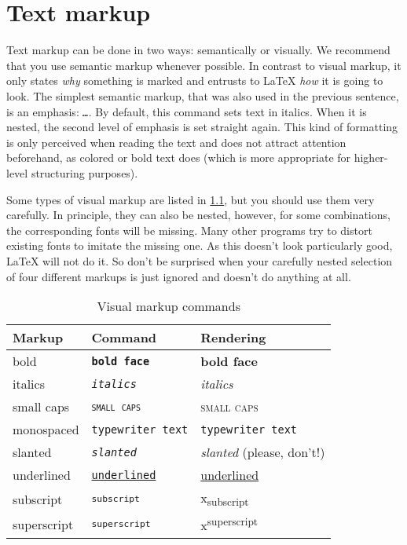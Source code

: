 \chapter{Text markup}

Text markup can be done in two ways: semantically or visually.
We recommend that you use semantic markup whenever possible.
In contrast to visual markup, it only states \emph{why} something is marked and entrusts to \LaTeX{} \emph{how} it is going to look.
The simplest semantic markup, that was also used in the previous sentence, is an emphasis: \texttt{\emph{…}}.
By default, this command sets text in italics.
When it is nested, the second level of emphasis is set straight again.
This kind of formatting is only perceived when reading the text and does not attract attention beforehand, as colored or bold text does (which is more appropriate for higher-level structuring purposes).

Some types of visual markup are listed in \cref{tbl:visual-markup}, but you should use them very carefully.
In principle, they can also be nested, however, for some combinations, the corresponding fonts will be missing.
Many other programs try to distort existing fonts to imitate the missing one.
As this doesn’t look particularly good, \LaTeX{} will not do it.
So don’t be surprised when your carefully nested selection of four different markups is just ignored and doesn’t do anything at all.

\begin{table}[H]
	\center
	\begin{tabular}{lll}
		\toprule
		Markup & Command & Rendering \\
		\midrule
		bold & \texttt{\textbf{bold face}} & \textbf{bold face} \\
		italics & \texttt{\textit{italics}} & \textit{italics} \\
		small caps & \texttt{\textsc{small caps}} & \textsc{small caps} \\
		monospaced & \texttt{\texttt{typewriter text}} & \texttt{typewriter text} \\
		slanted & \texttt{\textsl{slanted}} & \textsl{slanted} (please, don’t!) \\
		underlined & \texttt{\underline{underlined}} & \underline{underlined} \\
		subscript & \texttt{\textsubscript{subscript}} & x\textsubscript{subscript} \\
		superscript & \texttt{\textsubscript{superscript}} & x\textsuperscript{superscript} \\
		\bottomrule
	\end{tabular}
	\caption{Visual markup commands}
	\label{tbl:visual-markup}
\end{table}

